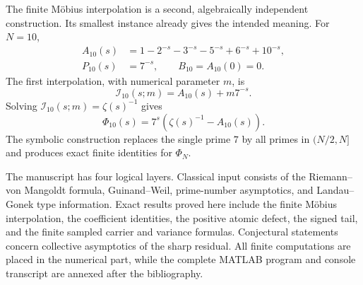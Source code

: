 \documentclass[11pt]{amsart}
\numberwithin{equation}{section}
\theoremstyle{plain}
\theoremstyle{definition}
\theoremstyle{remark}
\newcommand{\1}{\mathbf{1}}
\begin{document}
The finite Möbius interpolation is a second, algebraically independent
construction.  Its smallest instance already gives the intended meaning.
For $N=10$,
\begin{align}
A_{10}(s)
&=1-2^{-s}-3^{-s}-5^{-s}+6^{-s}+10^{-s},
\label{eq:intro_A10}
\\
P_{10}(s)&=7^{-s},
\qquad B_{10}=A_{10}(0)=0.
\label{eq:intro_P10_B10}
\end{align}
The first interpolation, with numerical parameter $m$, is
\begin{equation}
\mathcal I_{10}(s;m)=A_{10}(s)+m7^{-s}.
\label{eq:intro_I10}
\end{equation}
Solving $\mathcal I_{10}(s;m)=\zeta(s)^{-1}$ gives
\begin{equation}
\Phi_{10}(s)=7^s\left(\zeta(s)^{-1}-A_{10}(s)\right).
\label{eq:intro_Phi10}
\end{equation}
The symbolic construction replaces the single prime $7$ by all primes in
$(N/2,N]$ and produces exact finite identities for $\Phi_N$.

The manuscript has four logical layers.  Classical input consists of the
Riemann--von Mangoldt formula, Guinand--Weil, prime-number asymptotics, and
Landau--Gonek type information.  Exact results proved here include the finite
Möbius interpolation, the coefficient identities, the positive atomic defect,
the signed tail, and the finite sampled carrier and variance formulas.
Conjectural statements concern collective asymptotics of the sharp residual.
All finite computations are placed in the numerical part, while the complete
MATLAB program and console transcript are annexed after the bibliography.
\end{document}
